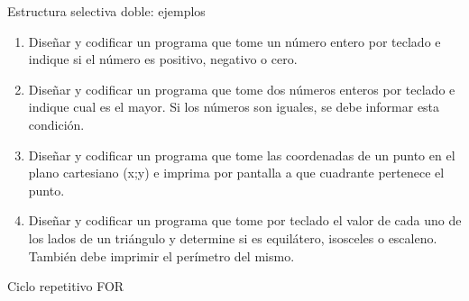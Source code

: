\documentclass[xcolor=pdftex,table,11pt]{beamer}
\begin{document}
\begin{frame}{Estructura selectiva doble: ejemplos}
 \begin{enumerate}
   
     	\item Diseñar y codificar un programa que tome un número entero por teclado e indique si el número es positivo, negativo o cero.     	
\href{https://github.com/danis963/informaticaI_IUA/blob/main/c/src/2-2_if_else.c}{}



     	\item Diseñar y codificar un programa que tome dos números enteros por teclado e indique cual es el mayor. Si los números son iguales, se debe informar esta condición.
     	
	\href{https://github.com/danis963/informaticaI_IUA/blob/main/c/src/2-3_if_else.c}{}

     	\item Diseñar y codificar un programa que tome las coordenadas de un punto en el plano cartesiano (x;y) e imprima por pantalla a que cuadrante pertenece el punto.


	\href{https://github.com/danis963/informaticaI_IUA/blob/main/c/src/2-4_if_else.c}{}
   
   
   
       \item Diseñar y codificar un programa que tome por teclado el valor de cada uno de los lados de un triángulo y determine si es equilátero, isosceles o escaleno. También debe imprimir el perímetro del mismo.


	\href{https://github.com/danis963/informaticaI_IUA/blob/main/c/src/2-5_if_else.c}{}
   \end{enumerate}
   

\end{frame}

\begin{frame}{Ciclo repetitivo FOR}
\end{frame}
\end{document}
